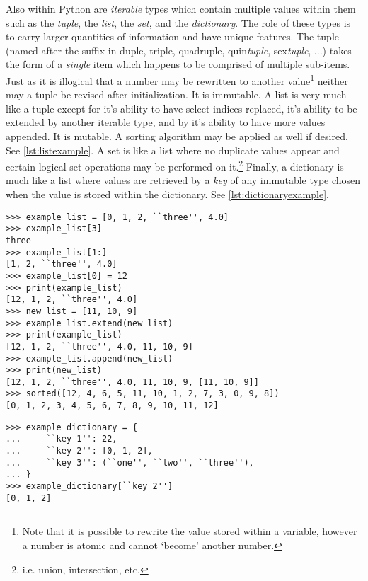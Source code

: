 Also within Python are \textit{iterable} types which contain multiple values within them such as the \textit{tuple}, the \textit{list}, the \textit{set}, and the \textit{dictionary}. The role of these types is to carry larger quantities of information and have unique features. The tuple (named after the suffix in duple, triple, quadruple, quin\textit{tuple}, sex\textit{tuple}, ...) takes the form of a \textit{single} item which happens to be comprised of multiple sub-items. Just as it is illogical that a number may be rewritten to another value\footnote{Note that it is possible to rewrite the value stored within a variable, however a number is atomic and cannot `become' another number.} neither may a tuple be revised after initialization. It is immutable. A list is very much like a tuple except for it's ability to have select indices replaced, it's ability to be extended by another iterable type, and by it's ability to have more values appended. It is mutable. A sorting algorithm may be applied as well if desired. See \autoref{lst:listexample}. A set is like a list where no duplicate values appear and certain logical set-operations may be performed on it.\footnote{i.e. union, intersection, etc.} Finally, a dictionary is much like a list where values are retrieved by a \textit{key} of any immutable type chosen when the value is stored within the dictionary. See \autoref{lst:dictionaryexample}.

\begin{lstlisting}[frame=tb,caption={Example of list notation},label=lst:listexample]
>>> example_list = [0, 1, 2, ``three'', 4.0]
>>> example_list[3]
three
>>> example_list[1:]
[1, 2, ``three'', 4.0]
>>> example_list[0] = 12
>>> print(example_list)
[12, 1, 2, ``three'', 4.0]
>>> new_list = [11, 10, 9]
>>> example_list.extend(new_list)
>>> print(example_list)
[12, 1, 2, ``three'', 4.0, 11, 10, 9]
>>> example_list.append(new_list)
>>> print(new_list)
[12, 1, 2, ``three'', 4.0, 11, 10, 9, [11, 10, 9]]
>>> sorted([12, 4, 6, 5, 11, 10, 1, 2, 7, 3, 0, 9, 8])
[0, 1, 2, 3, 4, 5, 6, 7, 8, 9, 10, 11, 12]
\end{lstlisting}

\begin{lstlisting}[frame=tb,caption={Example of dictionary notation},label=lst:dictionaryexample]
>>> example_dictionary = {
...     ``key 1'': 22,
...     ``key 2'': [0, 1, 2],
...     ``key 3'': (``one'', ``two'', ``three''),
... }
>>> example_dictionary[``key 2'']
[0, 1, 2]
\end{lstlisting}

